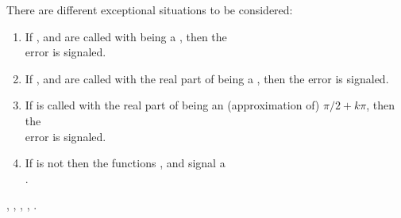 \documentclass[../Exponentials-Logarithms-Trigonometry.tex]{subfiles}
\begin{document}
There are different exceptional situations to be considered:
\begin{enumerate}
\item If ,  and  are called with
   being a , then the\\
   error is signaled.
\item If ,  and  are called with the real
  part of  being a , then the
   error is signaled.
\item If  is called with the real part of
   being an (approximation of) $\pi/2 + k\pi$, then the\\
   error is signaled.
\item If  is not \CL{}
   then the functions ,  and
   signal a\\
  .
\end{enumerate}

\DSeeAlso{}

\code{*}, \code{-}, , , .
\end{document}
